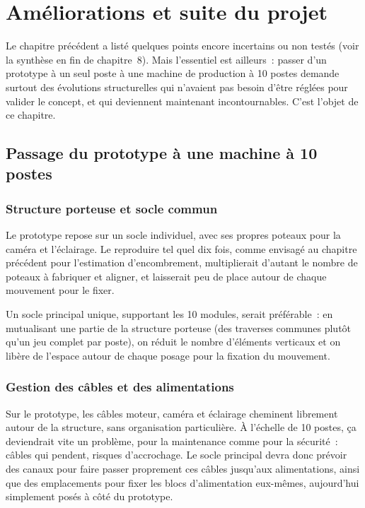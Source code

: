 \chapter{Améliorations et suite du projet}
\label{ch:ameliorations}

Le chapitre précédent a listé quelques points encore incertains ou non testés
(voir la synthèse en fin de chapitre~8). Mais l'essentiel est ailleurs~:
passer d'un prototype à un seul poste à une machine de production à 10
postes demande surtout des évolutions structurelles qui n'avaient pas besoin
d'être réglées pour valider le concept, et qui deviennent maintenant
incontournables. C'est l'objet de ce chapitre.

\section{Passage du prototype à une machine à 10 postes}

\subsection{Structure porteuse et socle commun}

Le prototype repose sur un socle individuel, avec ses propres poteaux pour
la caméra et l'éclairage. Le reproduire tel quel dix fois, comme envisagé au
chapitre précédent pour l'estimation d'encombrement, multiplierait d'autant
le nombre de poteaux à fabriquer et aligner, et laisserait peu de place
autour de chaque mouvement pour le fixer.

Un socle principal unique, supportant les 10 modules, serait préférable~: en
mutualisant une partie de la structure porteuse (des traverses communes
plutôt qu'un jeu complet par poste), on réduit le nombre d'éléments verticaux
et on libère de l'espace autour de chaque posage pour la fixation du
mouvement.

\subsection{Gestion des câbles et des alimentations}

Sur le prototype, les câbles moteur, caméra et éclairage cheminent librement
autour de la structure, sans organisation particulière. À l'échelle de 10
postes, ça deviendrait vite un problème, pour la maintenance comme pour la
sécurité~: câbles qui pendent, risques d'accrochage. Le socle principal
devra donc prévoir des canaux pour faire passer proprement ces câbles
jusqu'aux alimentations, ainsi que des emplacements pour fixer les blocs
d'alimentation eux-mêmes, aujourd'hui simplement posés à côté du prototype.

